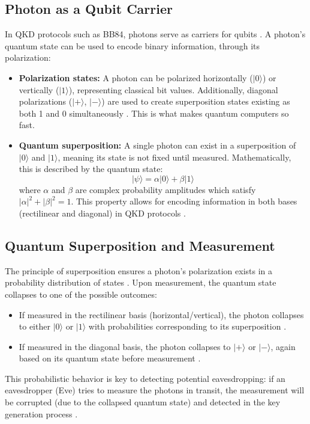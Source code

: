 \documentclass{article}
\begin{document}
\subsection{Photon as a Qubit Carrier}
In QKD protocols such as BB84, photons serve as carriers for qubits \parencite{bennett1984}. A photon's quantum state can be used to encode binary information, through its polarization:
\begin{itemize}
    \item \textbf{Polarization states:} A photon can be polarized horizontally ($|0\rangle$) or vertically ($|1\rangle$), representing classical bit values. Additionally, diagonal polarizations ($|+\rangle$, $|-\rangle$) are used to create superposition states existing as both 1 and 0 simultaneously \parencite{nielsen2010}. This is what makes quantum computers so fast. 
    \item \textbf{Quantum superposition:} A single photon can exist in a superposition of $|0\rangle$ and $|1\rangle$, meaning its state is not fixed until measured. Mathematically, this is described by the quantum state:
    \[
    |\psi\rangle = \alpha |0\rangle + \beta |1\rangle
    \]
    where $\alpha$ and $\beta$ are complex probability amplitudes which satisfy $|\alpha|^2 + |\beta|^2 = 1$. This property allows for encoding information in both bases (rectilinear and diagonal) in QKD protocols \parencite{nielsen2010}.
\end{itemize}

\subsection{Quantum Superposition and Measurement}
The principle of superposition ensures a photon's polarization exists in a probability distribution of states \parencite{yin2017}. Upon measurement, the quantum state collapses to one of the possible outcomes:
\begin{itemize}
    \item If measured in the rectilinear basis (horizontal/vertical), the photon collapses to either $|0\rangle$ or $|1\rangle$ with probabilities corresponding to its superposition \parencite{patel2020}.
    \item If measured in the diagonal basis, the photon collapses to $|+\rangle$ or $|-\rangle$, again based on its quantum state before measurement \parencite{nielsen2010}.
\end{itemize}
This probabilistic behavior is key to detecting potential eavesdropping: if an eavesdropper (Eve) tries to measure the photons in transit, the measurement will be corrupted (due to the collapsed quantum state) and detected in the key generation process \parencite{scarani2014}.
\end{document}
